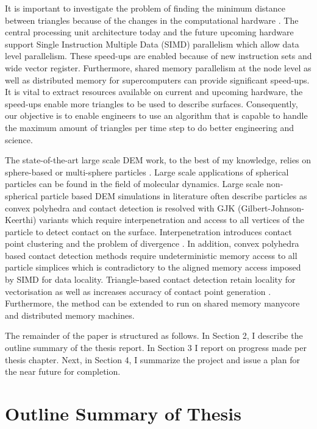 \documentclass[times,12pt]{article}
\begin{document}
It is important to investigate the problem of finding the minimum distance between triangles because of the changes in the computational hardware \cite{Dongarra2011}. The central processing unit architecture today and the future upcoming hardware support Single Instruction Multiple Data (SIMD)\cite{Alvarez2007} parallelism which allow data level parallelism. These speed-ups are enabled because of new instruction sets and wide vector register. Furthermore, shared memory parallelism at the node level as well as distributed memory for supercomputers can provide significant speed-ups. It is vital to extract resources available on current and upcoming hardware, the speed-ups enable more triangles to be used to describe surfaces. Consequently, our objective is to enable engineers to use an algorithm that is capable to handle the maximum amount of triangles per time step to do better engineering and science.

The state-of-the-art large scale DEM work, to the best of my knowledge, relies on sphere-based or multi-sphere particles \cite{Gonnet2013, Gonnet2014}. Large scale applications of spherical particles can be found in the field of molecular dynamics. Large scale non-spherical particle based DEM simulations in literature \cite{Girolami2012, Iglberger2009, Iglberger2010, Iglberger2011} often describe particles as convex polyhedra and contact detection is resolved with GJK (Gilbert-Johnson-Keerthi) \cite{Ericson2005} variants which require interpenetration and access to all vertices of the particle to detect contact on the surface. Interpenetration introduces contact point clustering and the problem of divergence \cite{Koziara2008, koziara2011, Krestenitis2015}. In addition, convex polyhedra based contact detection methods require undeterministic memory access to all particle simplices \cite{Ericson2005} which is contradictory to the aligned memory access imposed by SIMD for data locality. Triangle-based contact detection retain locality for vectorisation as well as increases accuracy of contact point generation \cite{Krestenitis2015}. Furthermore, the method can be extended to run on shared memory manycore and distributed memory machines.

The remainder of the paper is structured as follows. In Section 2, I describe the outline summary of the thesis report. In Section 3 I report on progress made per thesis chapter. Next, in Section 4, I summarize the project and issue a plan for the near future for completion.

\section{Outline Summary of Thesis}
\end{document}
